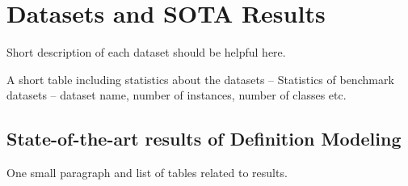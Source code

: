 \section{Datasets and SOTA Results}

Short description of each dataset should be helpful here.

A short table including statistics about the datasets -- Statistics of benchmark datasets -- dataset name, number of instances, number of classes etc.

\subsection{State-of-the-art results of Definition Modeling}
One small paragraph and list of tables related to results.
